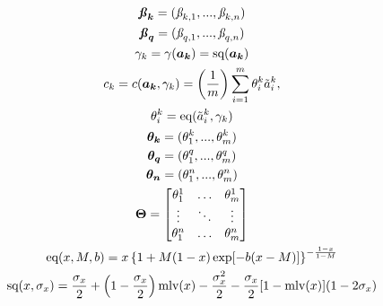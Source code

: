 \documentclass{article}
\begin{document}
\begin{gather}
    \boldsymbol{\textbf{\textit{\ss}}_{k}} = (\textit{\ss}_{k,1}, ..., \textit{\ss}_{k,n})\\
    \boldsymbol{\textbf{\textit{\ss}}_{q}} = (\textit{\ss}_{q,1}, ..., \textit{\ss}_{q,n})\\
    \gamma_{k} = 
    \gamma(\boldsymbol{a_k}) = 
        \text{sq}(\boldsymbol{a_k})\\
    c_{k} = 
    c(\boldsymbol{a_k}, \gamma_{k}) = 
        \left( \frac{1}{m} \right)
        \sum_{i=1}^{m}{
            \theta_{i}^{k}
            \tilde{a}_{i}^{k}
            },\\
    \theta_{i}^{k} = \text{eq}(\tilde{a}_{i}^{k}, \gamma_{k})\\
    \boldsymbol{\theta_{k}} = (\theta_{1}^{k}, ..., \theta_{m}^{k})\\
    \boldsymbol{\theta_{q}} = (\theta_{1}^{q}, ..., \theta_{m}^{q})\\
    \boldsymbol{\theta_{n}} = (\theta_{1}^{n}, ..., \theta_{m}^{n})\\
    \boldsymbol{\Theta} = 
    \begin{bmatrix}
        \theta_{1}^{1} & \hdots & \theta_{m}^{1}\\
        \vdots & \ddots & \vdots\\
        \theta_{1}^{n} & \hdots & \theta_{m}^{n}\\
    \end{bmatrix}\\
    \text{eq}(x,M,b) = 
    x\left\{
        1 + M (1 - x) \exp[-b(x - M)]
    \right\} ^ {
        -\frac{
            1 - x
        }{
            1 - M
        }
    }\\
    \text{sq}(x,\sigma_x) = 
    \frac{\sigma_x}{2} + 
    \left(
        1 - \frac{\sigma_x}{2}
    \right) \text{mlv}(x) -
    \frac{\sigma_x ^ 2}{2} -
    \frac{\sigma_x}{2} [
        1 - \text{mlv}(x)
    ] (
        1 - 2\sigma_x
    )
\end{gather}
\end{document}
